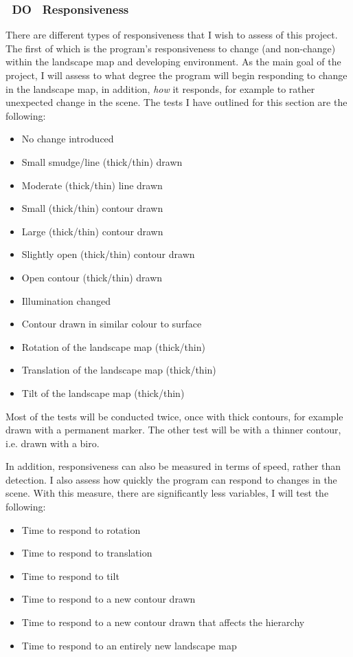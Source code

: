 \documentclass[11pt]{article}
\begin{document}
\subsubsection{~DO~ Responsiveness}
There are different types of responsiveness that I wish to assess of this 
project. The first of which is the program's responsiveness to change (and
non-change) within the landscape map and developing environment. As the
main goal of the project, I will assess to what degree the program will
begin responding to change in the landscape map, in addition, 
\textit{how} it responds, for example to rather unexpected change in the
scene. The tests I have outlined for this section are the following:
\begin{itemize}
	\item No change introduced
	\item Small smudge/line (thick/thin) drawn
	\item Moderate (thick/thin) line drawn 
	\item Small (thick/thin) contour drawn
	\item Large (thick/thin) contour drawn
	\item Slightly open (thick/thin) contour drawn
	\item Open contour (thick/thin) drawn
	\item Illumination changed
	\item Contour drawn in similar colour to surface
	\item Rotation of the landscape map (thick/thin) 
	\item Translation of the landscape map (thick/thin) 
	\item Tilt of the landscape map (thick/thin) 
\end{itemize}

Most of the tests will be conducted twice, once with thick contours,
for example drawn with a permanent marker. The other test will be
with a thinner contour, i.e. drawn with a biro.

In addition, responsiveness can also be measured in terms of speed, rather
than detection. I also assess how quickly the program can respond
to changes in the scene. With this measure, there are significantly
less variables, I will test the following:

\begin{itemize}
	\item Time to respond to rotation
	\item Time to respond to translation
	\item Time to respond to tilt
	\item Time to respond to a new contour drawn
	\item Time to respond to a new contour drawn that affects the hierarchy
	\item Time to respond to an entirely new landscape map
\end{itemize}
\end{document}
